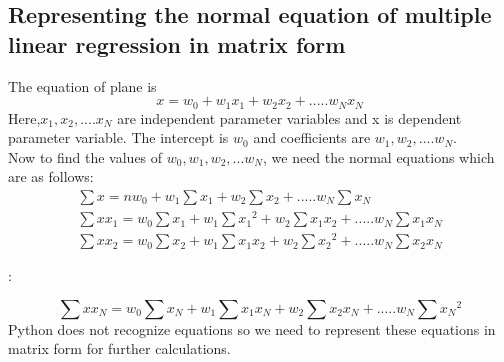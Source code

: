\subsection{Representing the normal equation of multiple linear regression in matrix form}
\vspace{-18pt}
The equation of plane is
\begin{equation}
x=w_{0}+w_{1}x_{1}+w_{2}x_{2}+.....w_{N}x_{N}
\end{equation}
Here,$ x_{1},x_{2},....x_{N}$ are independent parameter variables and x is dependent parameter variable. The intercept is $w_{0}$ and coefficients are $w_{1},w_{2},....w_{N}$.\\
Now to find the values of $w_{0},w_{1},w_{2},...w_{N}$, we need the normal equations which are as follows:
\begin{eqnarray}
\sum{x}= nw_{0}+w_{1}\sum{x_{1}}+w_{2}\sum{x_{2}}+.....w_{N}\sum{x_{N}}\\
\sum{x x_{1}}= w_{0}\sum{x_{1}}+w_{1}\sum{x_{1}}^2+w_{2}\sum{x_{1}x_{2}}+.....w_{N}\sum{x_{1}x_{N}}\\
\sum{x x_{2}}= w_{0}\sum{x_{2}}+w_{1}\sum{x_{1}x_{2}}+w_{2}\sum{x_{2}}^2+.....w_{N}\sum{x_{2}x_{N}}
\end{eqnarray}
\begin{center}
:
\end{center}
\begin{equation}
\sum{x x_{N}}= w_{0}\sum{x_{N}}+w_{1}\sum{x_{1}x_{N}}+w_{2}\sum{x_{2}x_{N}}+.....w_{N}\sum{x_{N}}^2
\end{equation}
Python does not recognize equations so we need to represent these equations in matrix form for further calculations.

